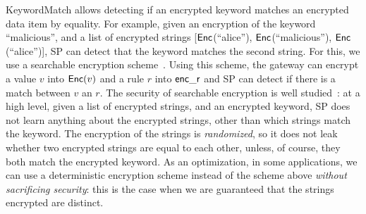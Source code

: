 KeywordMatch allows detecting if an encrypted keyword matches an encrypted data item by equality.
For example, given an encryption of the keyword ``malicious'', and a list of encrypted strings  [$\mathsf{Enc}$(``alice''), $\mathsf{Enc}$(``malicious''), $\mathsf{Enc}$(``alice'')], SP can  detect that the keyword matches the second string. 
For  this, we use a searchable encryption scheme~\cite{song:search, blindbox}.
Using this scheme, the gateway can encrypt a value $v$ into $\mathsf{Enc}(v)$ and a rule $r$ into $\mathsf{enc\_r}$ and SP can detect if there is a match between $v$ an $r$. 
 The security of searchable encryption is well studied~\cite{song:search, blindbox}: at a high level,  given a list of encrypted strings, and an encrypted keyword, SP does not learn anything about the encrypted strings, other than which strings match the keyword. %
 The encryption of the strings is {\em randomized}, so it does not leak whether two encrypted strings are equal to each other, unless, of course, they both match the encrypted keyword. 
%
As an optimization, in some applications, we can use a deterministic encryption scheme instead of the scheme above {\em without sacrificing security}: this is the case when we are guaranteed that the strings encrypted are distinct. %




